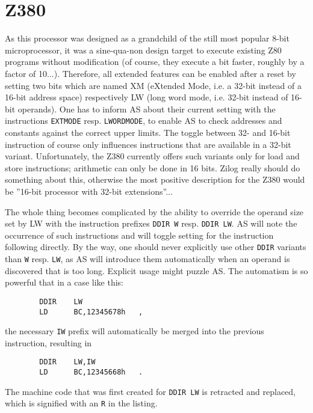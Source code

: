 \documentclass[12pt,twoside]{report}
\newcommand{\tty}[1]{{\tt #1}}
\newcommand{\asname}{{AS}}
\begin{document}

\section{Z380}

As this processor was designed as a grandchild of the still most popular
8-bit microprocessor, it was a sine-qua-non design target to execute
existing Z80 programs without modification (of course, they execute a bit
faster, roughly by a factor of 10...).  Therefore, all extended features
can be enabled after a reset by setting two bits which are named XM
(eXtended Mode, i.e. a 32-bit instead of a 16-bit address space)
respectively LW (long word mode, i.e. 32-bit instead of 16-bit operands).
One has to inform \asname{} about their current setting with the instructions
\tty{EXTMODE} resp. \tty{LWORDMODE}, to enable \asname{} to check addresses and
constants against the correct upper limits.  The toggle between 32- and
16-bit instruction of course only influences instructions that are
available in a 32-bit variant.  Unfortunately, the Z380 currently offers
such variants only for load and store instructions; arithmetic can only be
done in 16 bits.  Zilog really should do something about this, otherwise
the most positive description for the Z380 would be ''16-bit processor
with 32-bit extensions''...

The whole thing becomes complicated by the ability to override the operand
size set by LW with the instruction prefixes \tty{DDIR W} resp.
\tty{DDIR LW}.  \asname{} will note the occurrence of such instructions and will
toggle setting for the instruction following directly.  By the way, one
should never explicitly use other \tty{DDIR} variants than \tty{W} resp.
\tty{LW}, as \asname{} will introduce them automatically when an operand is
discovered that is too long.  Explicit usage might puzzle \asname{}.  The
automatism is so powerful that in a case like this:
\begin{verbatim}
        DDIR    LW
        LD      BC,12345678h   ,
\end{verbatim}
the necessary \tty{IW} prefix will automatically be merged into the previous
instruction, resulting in
\begin{verbatim}
        DDIR    LW,IW
        LD      BC,12345668h   .
\end{verbatim}
The machine code that was first created for \tty{DDIR LW} is retracted and
replaced, which is signified with an \tty{R} in the listing.
\end{document}
